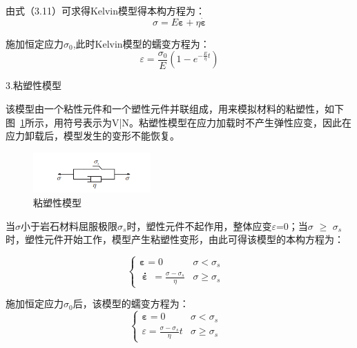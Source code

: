 由式（3.11）可求得Kelvin模型得本构方程为：
\begin{equation}
\sigma=E\boldsymbol{\varepsilon}+\eta\dot{\boldsymbol{\varepsilon}}
\end{equation}

施加恒定应力$\sigma_0$,此时Kelvin模型的蠕变方程为：
\begin{equation}
     {\varepsilon}=\frac{\sigma_0}{E}(1-e^{-\frac{E}{\eta }t})
\end{equation}


3.粘塑性模型

该模型由一个粘性元件和一个塑性元件并联组成，用来模拟材料的粘塑性，如下图~\ref{fig:3-7}所示，用符号表示为V|N。粘塑性模型在应力加载时不产生弹性应变，因此在应力卸载后，模型发生的变形不能恢复。

\begin{figure}[ht!]
    \centering
            \centering
            \includegraphics[width=0.4\textwidth]{img/chap3/V-N.png}
    \caption{粘塑性模型}
    \label{fig:3-7}
\end{figure}

当$\sigma$小于岩石材料屈服极限$\sigma_s$时，塑性元件不起作用，整体应变$\varepsilon$=0；当$\sigma$ $\geq$ $\sigma_s$时，塑性元件开始工作，模型产生粘塑性变形，由此可得该模型的本构方程为：

\begin{equation}
    \left\{\begin{matrix}
               \boldsymbol{\varepsilon} =0& \sigma <{{\sigma }_{s}} & \\
               \overset{\centerdot }{\mathop{\boldsymbol{\varepsilon} }}\,=\frac{\sigma -{{\sigma }_{s}}}{\eta } & \sigma \ge {{\sigma }_{s}}  &
    \end{matrix}\right.
\end{equation}

施加恒定应力$\sigma_0$后，该模型的蠕变方程为：
\begin{equation}
    \left\{\begin{matrix}
               \boldsymbol{\varepsilon} =0& \sigma <{{\sigma }_{s}} & \\
               {\varepsilon}=\frac{\sigma -{{\sigma }_{s}}}{\eta }t & \sigma \ge {{\sigma }_{s}}  &
    \end{matrix}\right.
\end{equation}

